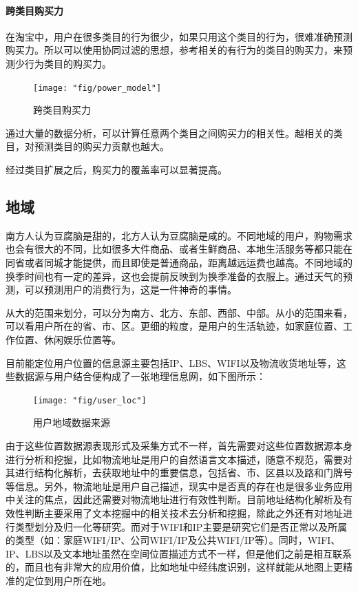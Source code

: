 	\paragraph{跨类目购买力}
	
	在淘宝中，用户在很多类目的行为很少，如果只用这个类目的行为，很难准确预测购买力。所以可以使用协同过滤的思想，参考相关的有行为的类目的购买力，来预测少行为类目的购买力。
	
	\begin{figure}[h]
		\centering
		\texttt{[image: "fig/power\_model"]}
		\caption{跨类目购买力}
		\label{fig:power_model}
	\end{figure}

	通过大量的数据分析，可以计算任意两个类目之间购买力的相关性。越相关的类目，对预测类目的购买力贡献也越大。
	
	经过类目扩展之后，购买力的覆盖率可以显著提高。
	
	\subsection{地域}
	
	南方人认为豆腐脑是甜的，北方人认为豆腐脑是咸的。不同地域的用户，购物需求也会有很大的不同，比如很多大件商品、或者生鲜商品、本地生活服务等都只能在同省或者同城才能提供，而且即使是普通商品，距离越远运费也越高。不同地域的换季时间也有一定的差异，这也会提前反映到为换季准备的衣服上。通过天气的预测，可以预测用户的消费行为，这是一件神奇的事情。
	
	从大的范围来划分，可以分为南方、北方、东部、西部、中部。从小的范围来看，可以看用户所在的省、市、区。更细的粒度，是用户的生活轨迹，如家庭位置、工作位置、休闲娱乐位置等。
	
	目前能定位用户位置的信息源主要包括IP、LBS、WIFI以及物流收货地址等，这些数据源与用户结合便构成了一张地理信息网，如下图所示：
	
	\begin{figure}[h]
		\centering
		\texttt{[image: "fig/user\_loc"]}
		\caption{用户地域数据来源}
		\label{fig:user_loc}
	\end{figure}

	由于这些位置数据源表现形式及采集方式不一样，首先需要对这些位置数据源本身进行分析和挖掘，比如物流地址是用户的自然语言文本描述，随意不规范，需要对其进行结构化解析，去获取地址中的重要信息，包括省、市、区县以及路和门牌号等信息。另外，物流地址是用户自己描述，现实中是否真的存在也是很多业务应用中关注的焦点，因此还需要对物流地址进行有效性判断。目前地址结构化解析及有效性判断主要采用了文本挖掘中的相关技术去分析和挖掘，除此之外还有对地址进行类型划分及归一化等研究。而对于WIFI和IP主要是研究它们是否正常以及所属的类型（如：家庭WIFI/IP、公司WIFI/IP及公共WIFI/IP等）。同时，WIFI、IP、LBS以及文本地址虽然在空间位置描述方式不一样，但是他们之前是相互联系的，而且也有非常大的应用价值，比如地址中经纬度识别，这样就能从地图上更精准的定位到用户所在地。
	
